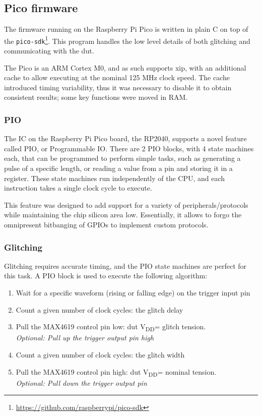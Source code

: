 \documentclass[a4paper,english,twoside,10pt]{article}
\newcommand{\vdd}{V\textsubscript{DD}}
\begin{document}
\subsection{Pico firmware}
The firmware running on the Raspberry Pi Pico is written in plain C on top of the \texttt{pico-sdk}\footnote{\url{https://github.com/raspberrypi/pico-sdk}}. This program handles the low level details of both glitching and communicating with the \gls{dut}.

The Pico is an ARM Cortex M0, and as such supports \gls{xip}, with an additional cache to allow executing at the nominal 125 MHz clock speed. The cache introduced timing variability, thus it was necessary to disable it to obtain consistent results; some key functions were moved in RAM.

\subsubsection{PIO}
The IC on the Raspberry Pi Pico board, the RP2040, supports a novel feature called PIO, or Programmable IO. There are 2 PIO blocks, with 4 state machines each, that can be programmed to perform simple tasks, such as generating a pulse of a specific length, or reading a value from a pin and storing it in a register. These state machines run independently of the CPU, and each instruction takes a single clock cycle to execute.

This feature was designed to add support for a variety of peripherals/protocols while maintaining the chip silicon area low. Essentially, it allows to forgo the omnipresent bitbanging of GPIOs to implement custom protocols.

\subsubsection{Glitching}
Glitching requires accurate timing, and the PIO state machines are perfect for this task. A PIO block is used to execute the following algorithm:
\begin{enumerate}
	\item Wait for a specific waveform (rising or falling edge) on the trigger input pin
	\item Count a given number of clock cycles: the glitch delay
	\item Pull the MAX4619 control pin low: \gls{dut} \vdd = glitch tension.\\
		  \textit{Optional: Pull up the trigger output pin high}
	\item Count a given number of clock cycles: the glitch width
	\item Pull the MAX4619 control pin high: \gls{dut} \vdd = nominal tension.\\
		  \textit{Optional: Pull down the trigger output pin}
\end{enumerate}
\end{document}
